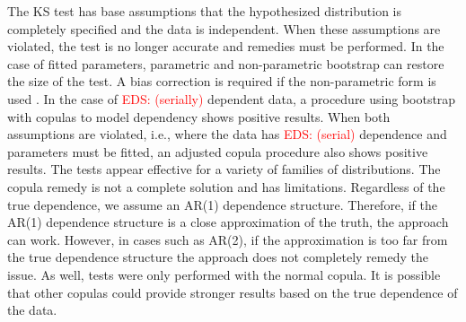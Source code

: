 \documentclass[12pt, letterpaper, titlepage]{article}
\newcommand{\eds}[1]{\textcolor{red}{EDS: (#1)}}
\begin{document}
The KS test has base assumptions that the hypothesized distribution is
completely specified and the data is independent. When these assumptions are
violated, the test is no longer accurate and remedies must be performed. In the
case of fitted parameters, parametric and non-parametric bootstrap can restore
the size of the test. A bias correction is required if the non-parametric form
is used \citep{Babu}. In the case of \eds{serially} dependent data, a procedure
using bootstrap
with copulas to model dependency shows positive results. When both assumptions
are violated, i.e., where the data has \eds{serial} dependence and parameters
must
be fitted, an adjusted copula procedure also shows positive results. The tests
appear effective for a variety of families of distributions. The copula remedy
is not a complete solution and has limitations. Regardless of the true
dependence, we assume an AR(1) dependence structure. Therefore, if the AR(1)
dependence structure is a close approximation of the truth, the approach can work.
However, in cases such as AR(2), if the approximation is too far from the true
dependence structure the approach does not completely remedy the issue. As well,
tests were only performed with the normal copula. It is possible that other
copulas could provide stronger results based on the true dependence of the data.



\end{document}
